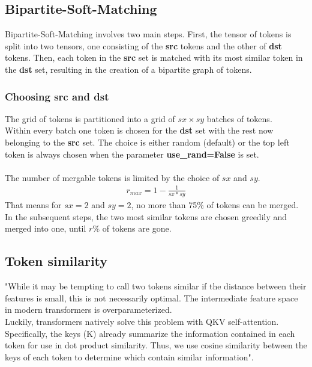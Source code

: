 \subsection{Bipartite-Soft-Matching}
Bipartite-Soft-Matching involves two main steps. First, the tensor of tokens is split into two tensors, one consisting of the \textbf{src} tokens and the other of \textbf{dst} tokens. Then, each token in the \textbf{src} set is matched with its most similar token in the \textbf{dst} set, resulting in the creation of a bipartite graph of tokens. 

\subsubsection*{Choosing src and dst}
The grid of tokens is partitioned into a grid of \(sx \times sy\) batches of tokens.\\
Within every batch one token is chosen for the \textbf{dst} set with the rest now belonging to the \textbf{src} set. The choice is either random (default) or the top left token is always chosen when the parameter \textbf{use\_rand=False} is set.\\
\\
The number of mergable tokens is limited by the choice of \(sx\) and \(sy\).
\begin{align*}
    r_{max} = 1-\frac{1}{sx*sy}
\end{align*}
That means for \(sx = 2\) and \(sy = 2\), no more than 75\% of tokens can be merged.\\
In the subsequent steps, the two most similar tokens are chosen greedily and merged into one, until \(r\%\) of tokens are gone.

\subsection{Token similarity}
"While it may be tempting to call two tokens similar if the distance between their features is small, this is not necessarily optimal. The intermediate feature space in modern transformers is overparameterized.\\ 
Luckily, transformers natively solve this problem with QKV self-attention\cite{vaswani2017attention}.
Specifically, the keys (K) already summarize the information contained in each token for use in dot product similarity. Thus, we use cosine similarity between the keys of each token to determine which contain similar information"\cite{bolya2023tome}.

\newpage
